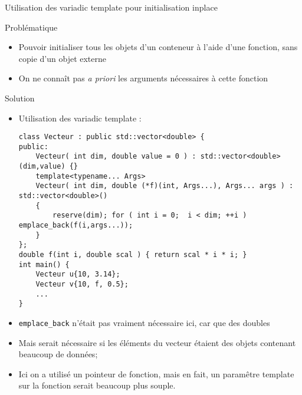 \documentclass[handout,10pt]{beamer}
\begin{document}
\begin{frame}[fragile]{Utilisation des variadic template pour initialisation inplace}
\tiny
\begin{alertblock}{Problématique}
\begin{itemize}
\item Pouvoir initialiser tous les objets d'un conteneur à l'aide d'une fonction, sans copie d'un objet externe
\item On ne connaît pas \textsl{a priori} les arguments nécessaires à cette fonction
\end{itemize}
\end{alertblock}
\begin{exampleblock}{Solution}
\begin{itemize}
\item Utilisation des variadic template :
\begin{lstlisting}
class Vecteur : public std::vector<double> {
public:
    Vecteur( int dim, double value = 0 ) : std::vector<double>(dim,value) {}
    template<typename... Args>
    Vecteur( int dim, double (*f)(int, Args...), Args... args ) : std::vector<double>()
    {
        reserve(dim); for ( int i = 0;  i < dim; ++i ) emplace_back(f(i,args...));
    }
};
double f(int i, double scal ) { return scal * i * i; }
int main() {
    Vecteur u{10, 3.14};
    Vecteur v{10, f, 0.5};
    ...
}
\end{lstlisting}
\item \lstinline$emplace_back$ n'était pas vraiment nécessaire ici, car que des doubles
\item Mais serait nécessaire si les éléments du vecteur étaient des objets contenant beaucoup de données;
\item Ici on a utilisé un pointeur de fonction, mais en fait, un paramêtre template sur la fonction serait beaucoup plus souple.
\end{itemize}
\end{exampleblock}
\end{frame}
\end{document}
